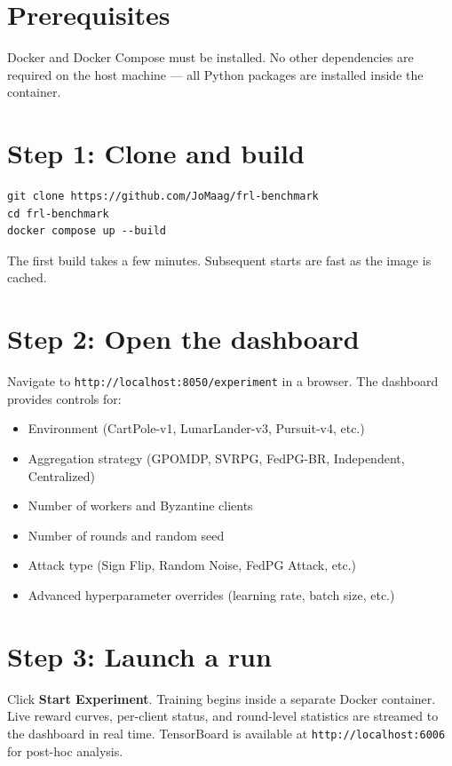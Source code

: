 \documentclass[a4paper, oneside]{discothesis}
\begin{document}
\section*{Prerequisites}

Docker and Docker Compose must be installed. No other dependencies are required on the host machine --- all Python packages are installed inside the container.

\section*{Step 1: Clone and build}

\begin{verbatim}
git clone https://github.com/JoMaag/frl-benchmark
cd frl-benchmark
docker compose up --build
\end{verbatim}

The first build takes a few minutes. Subsequent starts are fast as the image is cached.

\section*{Step 2: Open the dashboard}

Navigate to \texttt{http://localhost:8050/experiment} in a browser. The dashboard provides controls for:

\begin{itemize}
    \item Environment (CartPole-v1, LunarLander-v3, Pursuit-v4, etc.)
    \item Aggregation strategy (GPOMDP, SVRPG, FedPG-BR, Independent, Centralized)
    \item Number of workers and Byzantine clients
    \item Number of rounds and random seed
    \item Attack type (Sign Flip, Random Noise, FedPG Attack, etc.)
    \item Advanced hyperparameter overrides (learning rate, batch size, etc.)
\end{itemize}

\section*{Step 3: Launch a run}

Click \textbf{Start Experiment}. Training begins inside a separate Docker container. Live reward curves, per-client status, and round-level statistics are streamed to the dashboard in real time. TensorBoard is available at \texttt{http://localhost:6006} for post-hoc analysis.
\end{document}
